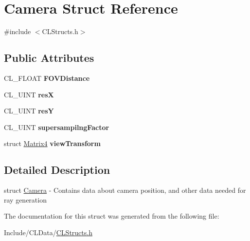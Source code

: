 \hypertarget{struct_camera}{}\section{Camera Struct Reference}
\label{struct_camera}


{\ttfamily \#include $<$C\+L\+Structs.\+h$>$}

\subsection*{Public Attributes}
\begin{DoxyCompactItemize}
\item 
C\+L\+\_\+\+F\+L\+O\+AT {\bfseries F\+O\+V\+Distance}\hypertarget{struct_camera_a9d786bdace5814fc6c18ee3920d153a1}{}\label{struct_camera_a9d786bdace5814fc6c18ee3920d153a1}

\item 
C\+L\+\_\+\+U\+I\+NT {\bfseries resX}\hypertarget{struct_camera_a8d7a0dd86608b67a72aeeb8ee18e7c0b}{}\label{struct_camera_a8d7a0dd86608b67a72aeeb8ee18e7c0b}

\item 
C\+L\+\_\+\+U\+I\+NT {\bfseries resY}\hypertarget{struct_camera_adef827c5e833ab92627678486a8f173c}{}\label{struct_camera_adef827c5e833ab92627678486a8f173c}

\item 
C\+L\+\_\+\+U\+I\+NT {\bfseries supersampilng\+Factor}\hypertarget{struct_camera_ab0500168f5d4a9e8c946ea832bfa6d58}{}\label{struct_camera_ab0500168f5d4a9e8c946ea832bfa6d58}

\item 
struct \hyperlink{struct_matrix4}{Matrix4} {\bfseries view\+Transform}\hypertarget{struct_camera_a82e094e849ef83a7f6f6d43fa2819d9a}{}\label{struct_camera_a82e094e849ef83a7f6f6d43fa2819d9a}

\end{DoxyCompactItemize}


\subsection{Detailed Description}
struct \hyperlink{struct_camera}{Camera} -\/ Contains data about camera position, and other data needed for ray generation 

The documentation for this struct was generated from the following file\+:\begin{DoxyCompactItemize}
\item 
Include/\+C\+L\+Data/\hyperlink{_c_l_structs_8h}{C\+L\+Structs.\+h}\end{DoxyCompactItemize}
